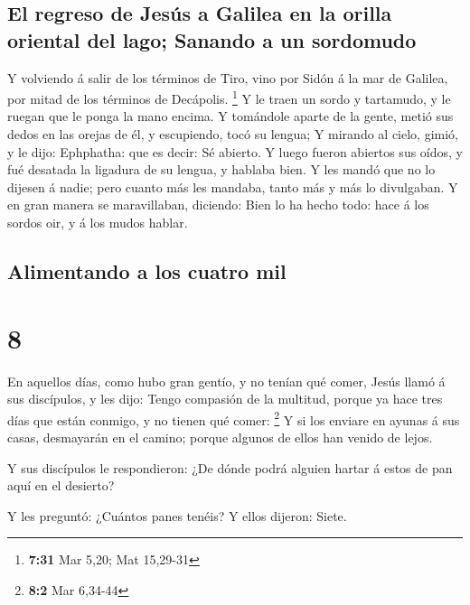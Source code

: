 \hypertarget{el-regreso-de-jesuxfas-a-galilea-en-la-orilla-oriental-del-lago-sanando-a-un-sordomudo}{%
\subsection{El regreso de Jesús a Galilea en la orilla oriental del
lago; Sanando a un
sordomudo}\label{el-regreso-de-jesuxfas-a-galilea-en-la-orilla-oriental-del-lago-sanando-a-un-sordomudo}}

 Y volviendo á salir de los términos de Tiro, vino por
Sidón á la mar de Galilea, por mitad de los términos de Decápolis.
\footnote{\textbf{7:31} Mar 5,20; Mat 15,29-31}  Y le traen
un sordo y tartamudo, y le ruegan que le ponga la mano encima.
 Y tomándole aparte de la gente, metió sus dedos en las
orejas de él, y escupiendo, tocó su lengua;  Y mirando al
cielo, gimió, y le dijo: Ephphatha: que es decir: Sé abierto.
 Y luego fueron abiertos sus oídos, y fué desatada la
ligadura de su lengua, y hablaba bien.  Y les mandó que no
lo dijesen á nadie; pero cuanto más les mandaba, tanto más y más lo
divulgaban.  Y en gran manera se maravillaban, diciendo:
Bien lo ha hecho todo: hace á los sordos oir, y á los mudos hablar.

\hypertarget{alimentando-a-los-cuatro-mil}{%
\subsection{Alimentando a los cuatro
mil}\label{alimentando-a-los-cuatro-mil}}

\hypertarget{section-7}{%
\section{8}\label{section-7}}

 En aquellos días, como hubo gran gentío, y no tenían qué
comer, Jesús llamó á sus discípulos, y les dijo:  Tengo
compasión de la multitud, porque ya hace tres días que están conmigo, y
no tienen qué comer: \footnote{\textbf{8:2} Mar 6,34-44}  Y
si los enviare en ayunas á sus casas, desmayarán en el camino; porque
algunos de ellos han venido de lejos.

 Y sus discípulos le respondieron: ¿De dónde podrá alguien
hartar á estos de pan aquí en el desierto?

 Y les preguntó: ¿Cuántos panes tenéis? Y ellos dijeron:
Siete.

